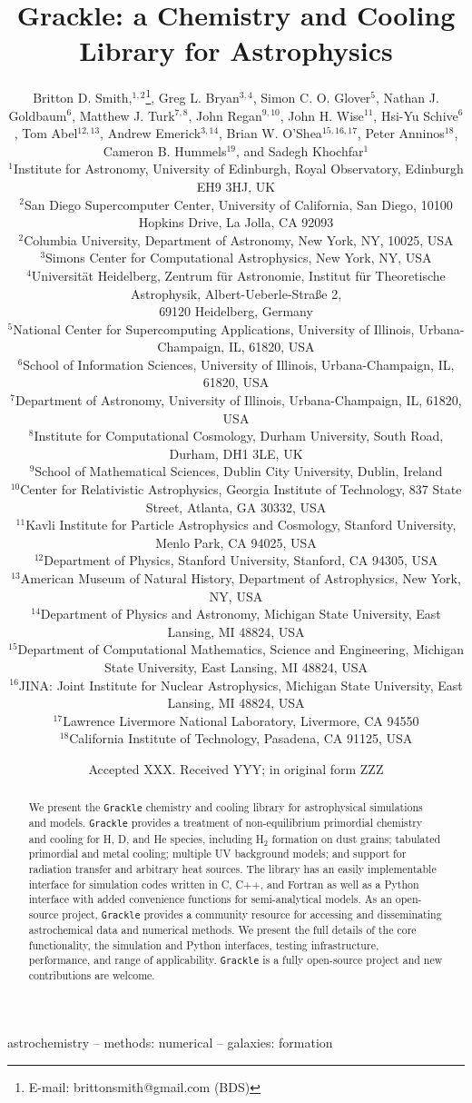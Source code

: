 \documentclass[a4paper,fleqn,usenatbib]{mnras}
\title[Grackle]{Grackle: a Chemistry and Cooling
  Library for Astrophysics}
\author[B.D. Smith et al.]
       {Britton D. Smith,$^{1,2}$\thanks{E-mail: brittonsmith@gmail.com
           (BDS)},
        Greg L. Bryan$^{3,4}$,
        Simon C. O. Glover$^{5}$,
        Nathan J. Goldbaum$^{6}$, \newauthor
        Matthew J. Turk$^{7,8}$,
        John Regan$^{9,10}$,
        John H. Wise$^{11}$,
        Hsi-Yu Schive$^{6}$,
        Tom Abel$^{12,13}$, \newauthor
        Andrew Emerick$^{3,14}$,
        Brian W. O'Shea$^{15,16,17}$,
        Peter Anninos$^{18}$, \newauthor
        Cameron B. Hummels$^{19}$,
        and Sadegh Khochfar$^{1}$\\
$^{1}$Institute for Astronomy, University of Edinburgh, Royal
Observatory, Edinburgh EH9 3HJ, UK\\
$^{2}$San Diego Supercomputer Center, University of California, San Diego,
10100 Hopkins Drive, La Jolla, CA 92093\\
$^{2}$Columbia University, Department of Astronomy, New York, NY,
10025, USA\\
$^{3}$Simons Center for Computational Astrophysics, New York, NY,
USA\\
$^{4}$Universit\"{a}t Heidelberg, Zentrum f\"{u}r Astronomie, Institut
f\"{u}r Theoretische Astrophysik, Albert-Ueberle-Stra{\ss}e 2, \\69120
Heidelberg, Germany\\
$^{5}$National Center for Supercomputing Applications, University of
Illinois, Urbana-Champaign, IL, 61820, USA\\
$^{6}$School of Information Sciences, University of Illinois,
Urbana-Champaign, IL, 61820, USA\\
$^{7}$Department of Astronomy, University of Illinois,
Urbana-Champaign, IL, 61820, USA\\
$^{8}$Institute for Computational Cosmology, Durham University, South
Road, Durham, DH1 3LE, UK \\
$^{9}$School of Mathematical Sciences, Dublin City University, Dublin,
Ireland \\
$^{10}$Center for Relativistic Astrophysics, Georgia Institute of
Technology, 837 State Street, Atlanta, GA 30332, USA\\
$^{11}$Kavli Institute for Particle Astrophysics and Cosmology,
Stanford University, Menlo Park, CA 94025, USA\\
$^{12}$Department of Physics, Stanford University, Stanford, CA 94305,
USA\\
$^{13}$American Museum of Natural History, Department of Astrophysics,
New York, NY, USA\\
$^{14}$Department of Physics and Astronomy, Michigan State University,
East Lansing, MI 48824, USA\\
$^{15}$Department of Computational Mathematics, Science and
Engineering, Michigan State University, East Lansing, MI 48824, USA\\
$^{16}$JINA: Joint Institute for Nuclear Astrophysics, Michigan State
University, East Lansing, MI 48824, USA\\
$^{17}$Lawrence Livermore National Laboratory, Livermore, CA 94550\\
$^{18}$California Institute of Technology, Pasadena, CA 91125, USA\\
}
\date{Accepted XXX. Received YYY; in original form ZZZ}
\begin{document}
\label{firstpage}
\pagerange{\pageref{firstpage}--\pageref{lastpage}}
\maketitle

\begin{abstract}
We present the \texttt{Grackle} chemistry and cooling library for
astrophysical simulations and models.  \texttt{Grackle} provides
a treatment of non-equilibrium primordial chemistry and cooling for H, D, and He
species, including H$_{2}$ formation on dust grains; tabulated
primordial and metal cooling; multiple UV background models; and
support for radiation transfer and arbitrary heat sources.  The
library has an easily implementable interface for simulation codes
written in C, C++, and Fortran as well as a Python interface with
added convenience functions for semi-analytical models.  As an
open-source project, \texttt{Grackle} provides a community resource
for accessing and disseminating astrochemical data and numerical
methods.  We present the full details of the core functionality, the
simulation and Python interfaces, testing infrastructure, performance,
and range of applicability.  \texttt{Grackle} is a fully open-source
project and new contributions are welcome.
\end{abstract}

\begin{keywords}
astrochemistry -- methods: numerical -- galaxies: formation
\end{keywords}

















\footnotesize{
  
  
}

\bsp
\label{lastpage}
\end{document}
